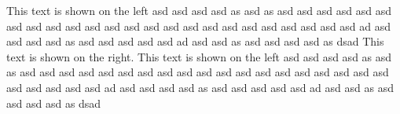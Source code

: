 \documentclass[a3paper]{article}
\begin{document}
This text is shown on the left asd asd asd asd as asd as asd asd asd asd asd
asd asd asd asd asd asd asd asd asd asd asd asd asd asd asd asd asd asd asd ad
asd asd asd asd as asd asd asd asd asd ad asd asd as asd asd asd asd as dsad 
\clearpage
This text is shown on the right.
This text is shown on the left asd asd asd asd as asd as asd asd asd asd asd
asd asd asd asd asd asd asd asd asd asd asd asd asd asd asd asd asd asd asd ad
asd asd asd asd as asd asd asd asd asd ad asd asd as asd asd asd asd as dsad 
\end{document}
